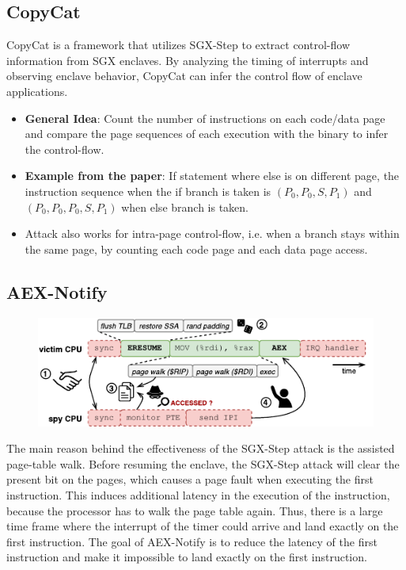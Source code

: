 \documentclass{llncs}
\begin{document}
\subsection{CopyCat}

CopyCat \cite{MoghimiBHPS20} is a framework that utilizes SGX-Step to extract control-flow information from SGX enclaves. By analyzing the timing of interrupts and observing enclave behavior, CopyCat can infer the control flow of enclave applications.

\begin{itemize}
  \item \textbf{General Idea}: Count the number of instructions on each code/data page
    and compare the page sequences of each execution with the binary to infer
    the control-flow.
  \item \textbf{Example from the paper}: If statement where else is on different page,
    the instruction sequence when the if branch is taken is $(P_0, P_0, S, P_1)$ and
    $(P_0, P_0, P_0, S, P_1)$ when else branch is taken.
  \item Attack also works for intra-page control-flow, i.e. when a branch stays
    within the same page, by counting each code page and each data page access.
\end{itemize}

\subsection{AEX-Notify}

\begin{figure}[t]
  \centering
  \includegraphics{images/sgx-step-pte.pdf}
  \caption{}
  \label{fig:sgx-step-pte}
\end{figure}

The main reason behind the effectiveness of the SGX-Step attack is the assisted
page-table walk.
Before resuming the enclave, the SGX-Step attack will clear the present bit
on the pages, which causes a page fault when executing the first instruction.
This induces additional latency in the execution of the instruction, because
the processor has to walk the page table again.
Thus, there is a large time frame where the interrupt of the timer could
arrive and land exactly on the first instruction.
The goal of AEX-Notify \cite{ConstableBCXXAK23} is to reduce the latency of the
first instruction and make it impossible to land exactly on the first
instruction.
\end{document}
